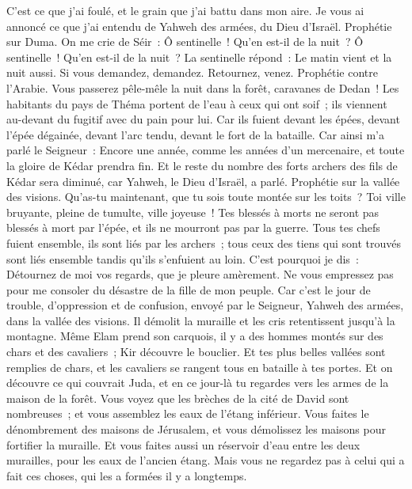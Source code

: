 \begin{multicols}{2}
C'est ce que j'ai foulé, et le grain que j'ai battu dans mon aire. Je vous ai annoncé ce que j'ai entendu de Yahweh des armées, du Dieu d'Israël.
Prophétie sur Duma. On me crie de Séir~: Ô sentinelle~! Qu'en est-il de la nuit~? Ô sentinelle~! Qu'en est-il de la nuit~?
La sentinelle répond~: Le matin vient et la nuit aussi. Si vous demandez, demandez. Retournez, venez.
Prophétie contre l'Arabie. Vous passerez pêle-mêle la nuit dans la forêt, caravanes de Dedan~!
Les habitants du pays de Théma portent de l'eau à ceux qui ont soif~; ils viennent au-devant du fugitif avec du pain pour lui.
Car ils fuient devant les épées, devant l'épée dégainée, devant l'arc tendu, devant le fort de la bataille.
Car ainsi m'a parlé le Seigneur~: Encore une année, comme les années d'un mercenaire, et toute la gloire de Kédar prendra fin.
Et le reste du nombre des forts archers des fils de Kédar sera diminué, car Yahweh, le Dieu d'Israël, a parlé.
\VerseOne{}Prophétie sur la vallée des visions. Qu'as-tu maintenant, que tu sois toute montée sur les toits~?
Toi ville bruyante, pleine de tumulte, ville joyeuse~! Tes blessés à morts ne seront pas blessés à mort par l'épée, et ils ne mourront pas par la guerre.
Tous tes chefs fuient ensemble, ils sont liés par les archers~; tous ceux des tiens qui sont trouvés sont liés ensemble tandis qu'ils s'enfuient au loin.
C'est pourquoi je dis~: Détournez de moi vos regards, que je pleure amèrement. Ne vous empressez pas pour me consoler du désastre de la fille de mon peuple.
Car c'est le jour de trouble, d'oppression et de confusion, envoyé par le Seigneur, Yahweh des armées, dans la vallée des visions. Il démolit la muraille et les cris retentissent jusqu'à la montagne.
Même Elam prend son carquois, il y a des hommes montés sur des chars et des cavaliers~; Kir découvre le bouclier.
Et tes plus belles vallées sont remplies de chars, et les cavaliers se rangent tous en bataille à tes portes.
Et on découvre ce qui couvrait Juda, et en ce jour-là tu regardes vers les armes de la maison de la forêt.
Vous voyez que les brèches de la cité de David sont nombreuses~; et vous assemblez les eaux de l'étang inférieur.
Vous faites le dénombrement des maisons de Jérusalem, et vous démolissez les maisons pour fortifier la muraille.
Et vous faites aussi un réservoir d'eau entre les deux murailles, pour les eaux de l'ancien étang. Mais vous ne regardez pas à celui qui a fait ces choses, qui les a formées il y a longtemps.

\end{multicols}
